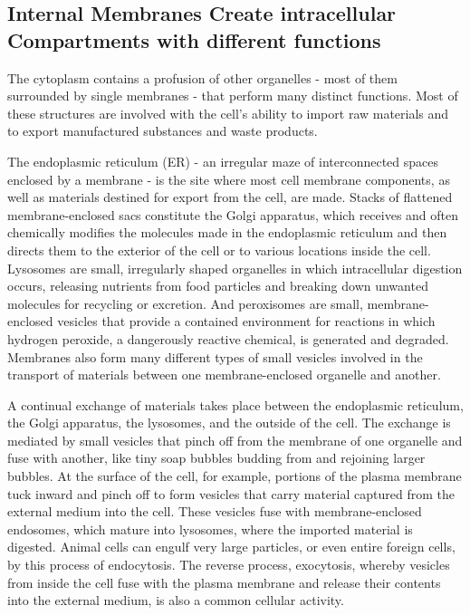 \subsection{Internal Membranes Create intracellular Compartments with different functions}

The cytoplasm contains a profusion of other organelles - most of them surrounded 
by single membranes - that perform many distinct functions. Most of these structures
are involved with the cell’s ability to import raw materials and to export
manufactured substances and waste products.

The endoplasmic reticulum (ER) - an irregular maze of interconnected
spaces enclosed by a membrane - is the site where most
cell membrane components, as well as materials destined for export
from the cell, are made. Stacks of flattened membrane-enclosed sacs
constitute the Golgi apparatus, which receives and often
chemically modifies the molecules made in the endoplasmic reticulum
and then directs them to the exterior of the cell or to various locations
inside the cell. Lysosomes are small, irregularly shaped organelles in
which intracellular digestion occurs, releasing nutrients from food particles 
and breaking down unwanted molecules for recycling or excretion.
And peroxisomes are small, membrane-enclosed vesicles that provide a
contained environment for reactions in which hydrogen peroxide, a dangerously 
reactive chemical, is generated and degraded. Membranes also
form many different types of small vesicles involved in the transport of
materials between one membrane-enclosed organelle and another.

A continual exchange of materials takes place between the endoplasmic 
reticulum, the Golgi apparatus, the lysosomes, and the outside of the
cell. The exchange is mediated by small vesicles that pinch off from the
membrane of one organelle and fuse with another, like tiny soap bubbles
budding from and rejoining larger bubbles. At the surface of the cell, for
example, portions of the plasma membrane tuck inward and pinch off
to form vesicles that carry material captured from the external medium
into the cell. These vesicles fuse with membrane-enclosed
endosomes, which mature into lysosomes, where the imported material
is digested. Animal cells can engulf very large particles, or even entire
foreign cells, by this process of endocytosis. The reverse process, exocytosis, 
whereby vesicles from inside the cell fuse with the plasma membrane
and release their contents into the external medium, is also a common
cellular activity.

